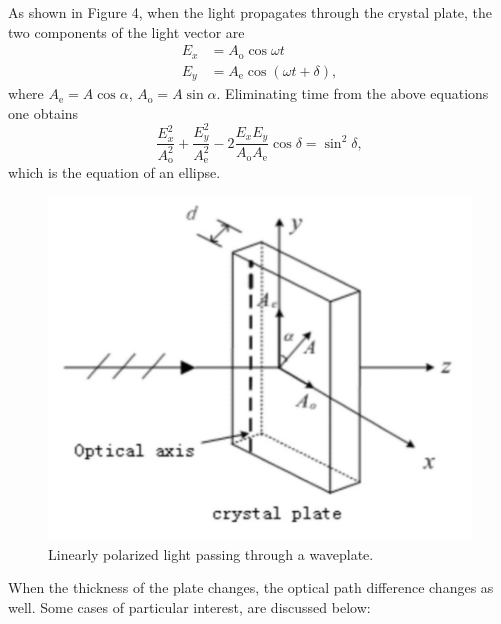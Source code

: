 \documentclass{article}
\begin{document}
As shown in Figure 4, when the light propagates through the crystal plate, the two components of the light vector are
\begin{align*}
E_x &= A_\text{o}\cos\omega t\\
E_y &= A_\text{e}\cos(\omega t + \delta),
\end{align*}
where $A_\text{e} = A\cos\alpha$, $A_\text{o} = A\sin\alpha$. Eliminating time from the above equations one obtains
\begin{equation}\label{eqE}
\frac{E_x^2}{A_\text{o}^2} + \frac{E_y^2}{A_\text{e}^2} - 2\frac{E_xE_y}{A_\text{o}A_\text{e}}\cos \delta = \sin^2\delta,
\end{equation}
which is the equation of an ellipse.

\begin{figure}[H]\centering
\includegraphics[scale=1.0]{crystal.png}
\caption{Linearly polarized light passing through a waveplate.}\label{FigCrystal}
\end{figure}

When the thickness of the plate changes, the optical path difference changes as well. Some cases of particular interest, are discussed below: 
\end{document}

